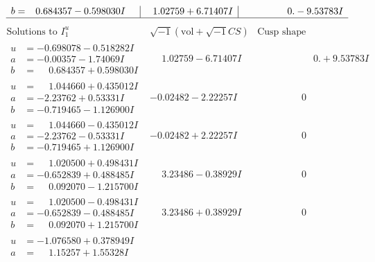 \documentclass[1p]{elsarticle_modified}
\theoremstyle{definition}
\newcommand{\I}{\sqrt{-1}}
\begin{document}
$$\begin{array}{c|c|c}
\begin{aligned}
b &= \phantom{-}0.684357 - 0.598030 I\end{aligned}
 & \phantom{-}1.02759 + 6.71407 I & \phantom{-0.000000 } 0. - 9.53783 I\\
 \hline 
 \end{array}$$\newpage$$\begin{array}{c|c|c}  
\text{Solutions to }I^u_{1}& \I (\text{vol} + \sqrt{-1}CS) & \text{Cusp shape}\\
 \hline 
\begin{aligned}
u &= -0.698078 - 0.518282 I \\
a &= -0.00357 - 1.74069 I \\
b &= \phantom{-}0.684357 + 0.598030 I\end{aligned}
 & \phantom{-}1.02759 - 6.71407 I & \phantom{-0.000000 -}0. + 9.53783 I \\ \hline\begin{aligned}
u &= \phantom{-}1.044660 + 0.435012 I \\
a &= -2.23762 + 0.53331 I \\
b &= -0.719465 - 1.126900 I\end{aligned}
 & -0.02482 - 2.22257 I & \phantom{-0.000000 } 0 \\ \hline\begin{aligned}
u &= \phantom{-}1.044660 - 0.435012 I \\
a &= -2.23762 - 0.53331 I \\
b &= -0.719465 + 1.126900 I\end{aligned}
 & -0.02482 + 2.22257 I & \phantom{-0.000000 } 0 \\ \hline\begin{aligned}
u &= \phantom{-}1.020500 + 0.498431 I \\
a &= -0.652839 + 0.488485 I \\
b &= \phantom{-}0.092070 - 1.215700 I\end{aligned}
 & \phantom{-}3.23486 - 0.38929 I & \phantom{-0.000000 } 0 \\ \hline\begin{aligned}
u &= \phantom{-}1.020500 - 0.498431 I \\
a &= -0.652839 - 0.488485 I \\
b &= \phantom{-}0.092070 + 1.215700 I\end{aligned}
 & \phantom{-}3.23486 + 0.38929 I & \phantom{-0.000000 } 0 \\ \hline\begin{aligned}
u &= -1.076580 + 0.378949 I \\
a &= \phantom{-}1.15257 + 1.55328 I \\

\end{aligned}
\end{array}$$
\end{document}
